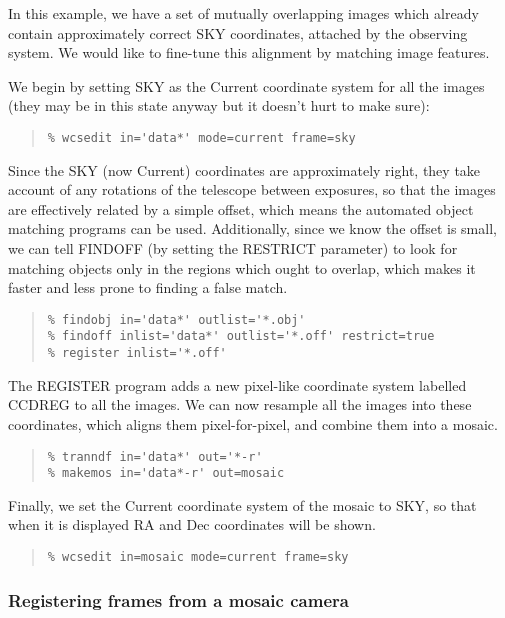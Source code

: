 \documentclass[twoside,11pt]{article}
\renewcommand{\_}{\texttt{\symbol{95}}}
\newenvironment{myquote}{\begin{quote}\begin{small}}{\end{small}\end{quote}}
\begin{document}
In this example, we have a set of mutually overlapping 
images which already contain approximately correct 
SKY coordinates, attached by the observing system.
We would like to fine-tune this alignment by matching image features.

We begin by setting SKY as the Current coordinate system for all
the images (they may be in this state anyway
but it doesn't hurt to make sure):
\begin{myquote}
\begin{verbatim}
% wcsedit in='data*' mode=current frame=sky
\end{verbatim}
\end{myquote}
Since the SKY (now Current) coordinates are approximately right,
they take account of any rotations of the telescope between
exposures, so that the images are effectively related by a simple offset,
which means the automated object matching programs can be used.
Additionally, since we know the offset is small,
we can tell FINDOFF (by setting the RESTRICT parameter)
to look for matching objects
only in the regions which ought to overlap, which makes it faster
and less prone to finding a false match.
\begin{myquote}
\begin{verbatim}
% findobj in='data*' outlist='*.obj'
% findoff inlist='data*' outlist='*.off' restrict=true
% register inlist='*.off'
\end{verbatim}
\end{myquote}
The REGISTER program adds a new pixel-like coordinate system
labelled CCD\_REG to all the images.
We can now resample all the images into these coordinates, which 
aligns them pixel-for-pixel, and combine them into a mosaic.
\begin{myquote}
\begin{verbatim}
% tranndf in='data*' out='*-r'
% makemos in='data*-r' out=mosaic
\end{verbatim}
\end{myquote}
Finally, we set the Current coordinate system of the mosaic to SKY, so
that when it is displayed RA and Dec coordinates will be shown.
\begin{myquote}
\begin{verbatim}
% wcsedit in=mosaic mode=current frame=sky
\end{verbatim}
\end{myquote}


\subsubsection{Registering frames from a mosaic camera}
\end{document}
